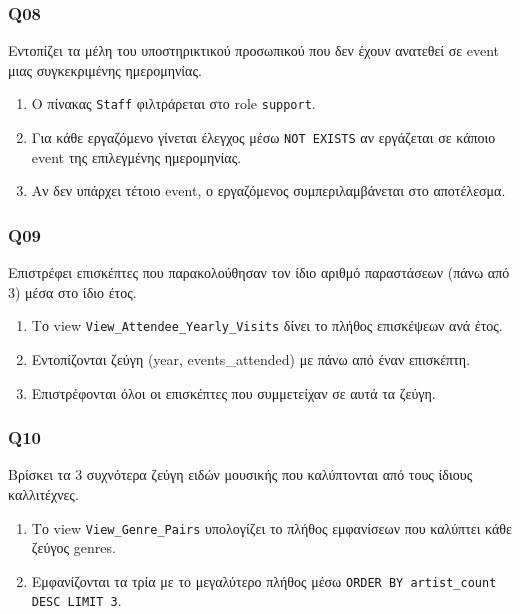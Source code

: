 \documentclass[13pt]{extarticle}
\begin{document}
\subsubsection{Q08}

Εντοπίζει τα μέλη του υποστηρικτικού προσωπικού που δεν έχουν ανατεθεί σε event μιας συγκεκριμένης ημερομηνίας.

\begin{enumerate}
    \item Ο πίνακας \texttt{Staff} φιλτράρεται στο role \texttt{support}.
    \item Για κάθε εργαζόμενο γίνεται έλεγχος μέσω \texttt{NOT EXISTS} αν εργάζεται σε κάποιο event της επιλεγμένης ημερομηνίας.
    \item Αν δεν υπάρχει τέτοιο event, ο εργαζόμενος συμπεριλαμβάνεται στο αποτέλεσμα.
\end{enumerate}

\subsubsection{Q09}

Επιστρέφει επισκέπτες που παρακολούθησαν τον ίδιο αριθμό παραστάσεων (πάνω από 3) μέσα στο ίδιο έτος.

\begin{enumerate}
    \item Το view \texttt{View\_Attendee\_Yearly\_Visits} δίνει το πλήθος επισκέψεων ανά έτος.
    \item Εντοπίζονται ζεύγη (year, events\_attended) με πάνω από έναν επισκέπτη.
    \item Επιστρέφονται όλοι οι επισκέπτες που συμμετείχαν σε αυτά τα ζεύγη.
\end{enumerate}

\subsubsection{Q10}

Βρίσκει τα 3 συχνότερα ζεύγη ειδών μουσικής που καλύπτονται από τους ίδιους καλλιτέχνες.

\begin{enumerate}
    \item Το view \texttt{View\_Genre\_Pairs} υπολογίζει το πλήθος εμφανίσεων που καλύπτει κάθε ζεύγος genres.
    \item Εμφανίζονται τα τρία με το μεγαλύτερο πλήθος μέσω \texttt{ORDER BY artist\_count DESC LIMIT 3}.
\end{enumerate}
\end{document}
